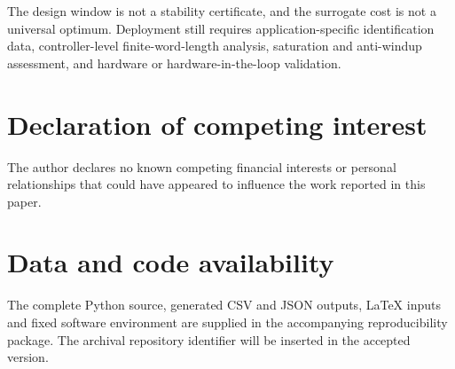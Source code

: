 \documentclass[a4paper,fleqn]{cas-sc}
\theoremstyle{remark}
\begin{document}
The design window is not a stability certificate, and the surrogate cost is not a universal optimum. Deployment still requires application-specific identification data, controller-level finite-word-length analysis, saturation and anti-windup assessment, and hardware or hardware-in-the-loop validation.

\section*{Declaration of competing interest}
The author declares no known competing financial interests or personal relationships that could have appeared to influence the work reported in this paper.

\section*{Data and code availability}
The complete Python source, generated CSV and JSON outputs, LaTeX inputs and fixed software environment are supplied in the accompanying reproducibility package. The archival repository identifier will be inserted in the accepted version.

\printcredits



\end{document}

